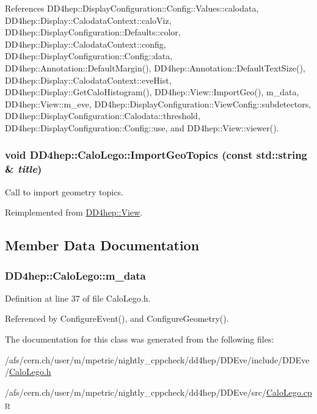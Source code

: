 References DD4hep::DisplayConfiguration::Config::Values::calodata, DD4hep::Display::CalodataContext::caloViz, DD4hep::DisplayConfiguration::Defaults::color, DD4hep::Display::CalodataContext::config, DD4hep::DisplayConfiguration::Config::data, DD4hep::Annotation::DefaultMargin(), DD4hep::Annotation::DefaultTextSize(), DD4hep::Display::CalodataContext::eveHist, DD4hep::Display::GetCaloHistogram(), DD4hep::View::ImportGeo(), m\_\-data, DD4hep::View::m\_\-eve, DD4hep::DisplayConfiguration::ViewConfig::subdetectors, DD4hep::DisplayConfiguration::Calodata::threshold, DD4hep::DisplayConfiguration::Config::use, and DD4hep::View::viewer().\hypertarget{class_d_d4hep_1_1_calo_lego_ac70c1949f20282374d052be75356ad2e}{
\subsubsection[{ImportGeoTopics}]{\setlength{\rightskip}{0pt plus 5cm}void DD4hep::CaloLego::ImportGeoTopics (const std::string \& {\em title})}}
\label{class_d_d4hep_1_1_calo_lego_ac70c1949f20282374d052be75356ad2e}


Call to import geometry topics. 

Reimplemented from \hyperlink{class_d_d4hep_1_1_view_a2e3e96341bb654afd42e0ae144cecafb}{DD4hep::View}.

\subsection{Member Data Documentation}
\hypertarget{class_d_d4hep_1_1_calo_lego_a2d5755595411d469277f8e9c823eb510}{
\subsubsection[{m\_\-data}]{ {\bf DD4hep::CaloLego::m\_\-data}}}
\label{class_d_d4hep_1_1_calo_lego_a2d5755595411d469277f8e9c823eb510}


Definition at line 37 of file CaloLego.h.

Referenced by ConfigureEvent(), and ConfigureGeometry().

The documentation for this class was generated from the following files:\begin{DoxyCompactItemize}
\item 
/afs/cern.ch/user/m/mpetric/nightly\_\-cppcheck/dd4hep/DDEve/include/DDEve/\hyperlink{_calo_lego_8h}{CaloLego.h}\item 
/afs/cern.ch/user/m/mpetric/nightly\_\-cppcheck/dd4hep/DDEve/src/\hyperlink{_calo_lego_8cpp}{CaloLego.cpp}\end{DoxyCompactItemize}
